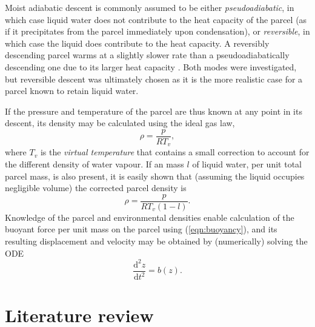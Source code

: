 \documentclass[12pt,titlepage]{article}
\begin{document}
Moist adiabatic descent is commonly assumed to be either
\emph{pseudoadiabatic}, in which case liquid water does not contribute
to the heat capacity of the parcel (as if it precipitates from the
parcel immediately upon condensation), or \emph{reversible}, in
which case the liquid does contribute to the heat capacity.
A reversibly descending parcel warms at a slightly slower rate than a
pseudoadiabatically descending one due to its larger heat capacity
\textcite{saunders_1957}.
Both modes were investigated, but reversible descent was ultimately
chosen as it is the more realistic case for a parcel known to retain
liquid water.

If the pressure and temperature of the parcel are thus known at any
point in its descent, its density may be calculated using the ideal
gas law,
\begin{equation}
	\rho = \frac{p}{RT_v}, \label{eqn:density}
\end{equation}
where $T_v$ is the \emph{virtual temperature} that contains a small
correction to account for the different density of water vapour.
If an mass $l$ of liquid water, per unit total parcel mass, is also
present, it is easily shown that (assuming the liquid occupies
negligible volume) the corrected parcel density is
\begin{equation}
	\rho = \frac{p}{RT_v (1 - l)}.
\end{equation}
Knowledge of the parcel and environmental densities enable calculation
of the buoyant force per unit mass on the parcel using
(\ref{eqn:buoyancy}), and its resulting displacement and velocity may be
obtained by (numerically) solving the ODE
\begin{equation}
	\frac{\mathrm{d}^2 z}{\mathrm{d}t^2} = b(z).
\end{equation}


\section{Literature review}

\end{document}
